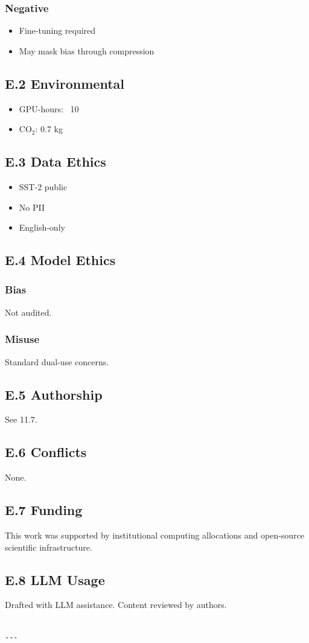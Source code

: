 \subsubsection{Negative}
\begin{itemize}
\item Fine-tuning required
\item May mask bias through compression

\end{itemize}
\subsection{E.2 Environmental}

\begin{itemize}
\item GPU-hours: ~10
\item CO$_2$: 0.7 kg

\end{itemize}
\subsection{E.3 Data Ethics}

\begin{itemize}
\item SST-2 public
\item No PII
\item English-only

\end{itemize}
\subsection{E.4 Model Ethics}

\subsubsection{Bias}
Not audited.

\subsubsection{Misuse}
Standard dual-use concerns.

\subsection{E.5 Authorship}

See  11.7.

\subsection{E.6 Conflicts}

None.

\subsection{E.7 Funding}

This work was supported by institutional computing allocations and open-source scientific infrastructure.

\subsection{E.8 LLM Usage}

Drafted with LLM assistance. Content reviewed by authors.
\begin{lstlisting}

---
\end{lstlisting}